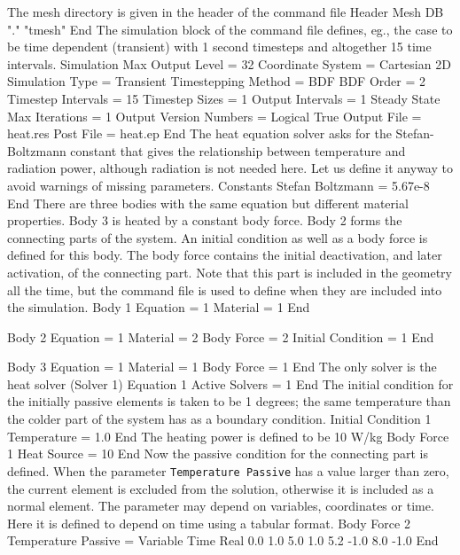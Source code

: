 The mesh directory is given in the header of the command file
%
\ttbegin
Header
  Mesh DB "." "tmesh"
End
\ttend
%
The simulation block of the command file defines, eg., the case to be time
dependent (transient) with 1 second timesteps and altogether 15 time
intervals.  
%
\ttbegin
Simulation
  Max Output Level = 32
  Coordinate System = Cartesian 2D
  Simulation Type = Transient
  Timestepping Method = BDF
  BDF Order = 2
  Timestep Intervals = 15
  Timestep Sizes = 1
  Output Intervals = 1
  Steady State Max Iterations = 1
  Output Version Numbers = Logical True
  Output File = heat.res
  Post File = heat.ep
End
\ttend
%
The heat equation solver asks for the Stefan-Boltzmann constant that
gives the relationship between temperature and radiation power,
although radiation is not needed here. Let us define it anyway to
avoid warnings of missing parameters.
%
\ttbegin
Constants
  Stefan Boltzmann = 5.67e-8
End
\ttend
%
There are three bodies with the same equation but different material
properties. Body 3 is heated by a constant body force. Body 2 forms
the connecting parts of the system. An initial condition as well as a
body force is defined for this body. The body force contains the
initial deactivation, and later activation, of the connecting
part. Note that this part is included in the geometry all the time,
but the command file is used to define when they are included into the
simulation.
%
\ttbegin
Body 1
  Equation = 1
  Material = 1
End

Body 2
  Equation = 1
  Material = 2
  Body Force = 2
  Initial Condition = 1
End

Body 3
  Equation = 1
  Material = 1
  Body Force = 1
End
\ttend
%
The only solver is the heat solver (Solver 1)
%
\ttbegin
Equation 1
  Active Solvers = 1
End
\ttend
%
The initial condition for the initially passive elements is taken to
be 1 degrees; the same temperature than the colder part of the system
has as a boundary condition.
%
\ttbegin
Initial Condition 1
  Temperature = 1.0
End
\ttend
%
The heating power is defined to be 10 W/kg
%
\ttbegin
Body Force 1
  Heat Source = 10
End
\ttend
%
Now the passive condition for the connecting part is defined. When the
parameter \texttt{Temperature Passive} has a value larger than zero,
the current element is excluded from the solution, otherwise it is
included as a normal element. The parameter may depend on variables,
coordinates or time. Here it is defined to depend on time using a
tabular format.
%
\ttbegin
Body Force 2
  Temperature Passive = Variable Time
    Real
      0.0    1.0
      5.0    1.0
      5.2   -1.0
      8.0   -1.0
    End

